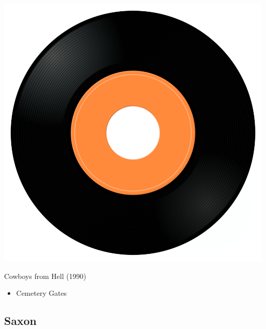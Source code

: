 \begin{minipage}[t]{0.25\textwidth}
\captionsetup{type=figure}
\includegraphics[width=\textwidth]{Images/cover.png}
\caption*{Cowboys from Hell (1990)}
\end{minipage}
\begin{minipage}[t]{0.25\textwidth}\vspace{0pt}
\begin{itemize}[nosep,leftmargin=1em,labelwidth=*,align=left]
	\setlength{\itemsep}{0pt}
	\item Cemetery Gates
\end{itemize}
\end{minipage}

\subsection{Saxon}

